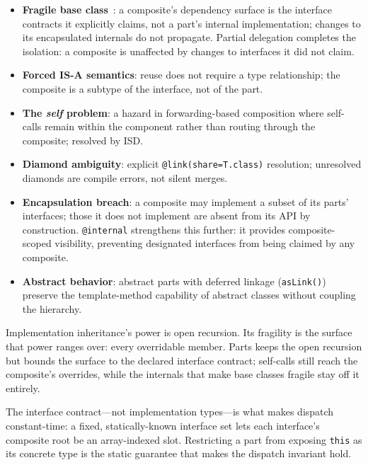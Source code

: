 \documentclass[acmsmall,nonacm]{acmart}
\theoremstyle{acmplain}
\theoremstyle{acmdefinition}
\newcommand{\code}[1]{\texttt{#1}}
\begin{document}
\begin{itemize}
  \item \textbf{Fragile base class}~\cite{mikhajlov1998}: a composite's dependency surface is
        the interface contracts it explicitly claims, not a part's internal
        implementation; changes to its encapsulated internals do not propagate. Partial
        delegation completes the isolation: a composite is unaffected by changes
        to interfaces it did not claim.
  \item \textbf{Forced IS-A semantics}: reuse does not require a type
        relationship; the composite is a subtype of the interface, not of the part.
  \item \textbf{The \emph{self} problem}: a hazard in forwarding-based composition
        where self-calls remain within the component rather than routing
        through the composite; resolved by ISD.
  \item \textbf{Diamond ambiguity}: explicit \code{@link(share=T.class)} resolution;
        unresolved diamonds are compile errors, not silent merges.
  \item \textbf{Encapsulation breach}: a composite may implement a subset
        of its parts' interfaces; those it does not implement are absent from
        its API by construction. \code{@internal} strengthens this further:
        it provides composite-scoped visibility, preventing designated
        interfaces from being claimed by any composite.
  \item \textbf{Abstract behavior}: abstract parts with deferred
        linkage (\code{asLink()}) preserve the template-method capability
        of abstract classes without coupling the hierarchy.
\end{itemize}

Implementation inheritance's power is open recursion. Its fragility is the surface that power ranges over: every overridable member. Parts keeps the open recursion but bounds the surface to the declared interface contract; self-calls still reach the composite's overrides, while the internals that make base classes fragile stay off it entirely.

The interface contract---not implementation types---is what makes dispatch constant-time: a fixed, statically-known interface set lets each interface's composite root be an array-indexed slot. Restricting a part from exposing \code{this} as its concrete type is the static guarantee that makes the dispatch invariant hold.
\end{document}
